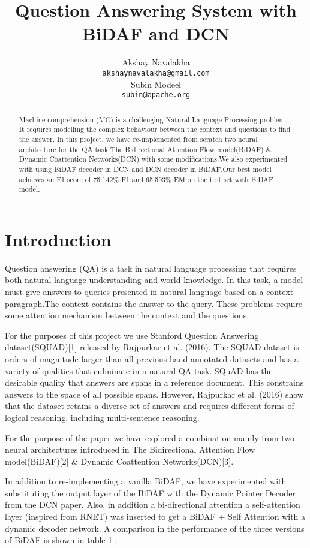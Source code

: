 \documentclass{article} %
\title{Question Answering System with BiDAF and DCN}
\author{
Akshay Navalakha \\
\texttt{akshaynavalakha@gmail.com} \\
\And
Subin Modeel \\
\texttt{subin@apache.org} \\
}
\begin{document}
\maketitle

\begin{abstract}
Machine comprehension (MC) is a challenging Natural Language Processing problem. It requires modelling the complex behaviour between the context and questions to find the answer. In this project, we have re-implemented from scratch two neural architecture for the QA task The Bidirectional Attention Flow
model(BiDAF) \& Dynamic Coattention Networks(DCN) with some modifications.We also experimented with using BiDAF decoder in DCN and DCN decoder in BiDAF.Our best model achieves an F1 score of  75.142\% F1 and 65.593\% EM on the test set with BiDAF model.
\end{abstract}

\section{Introduction}

Question answering (QA) is a task in natural language processing that requires both natural language understanding and world knowledge. In this task, a model must give answers to queries presented in natural language based on a context paragraph.The context contains the answer to the query. These problems require some attention mechanism between the context and the questions.

For the purposes of this project we use Stanford Question Answering dataset(SQUAD)[1] released by Rajpurkar et al. (2016). The SQUAD dataset is orders of magnitude larger than all previous hand-annotated datasets and has a variety of qualities that culminate in a natural QA task. SQuAD has the desirable quality that answers are spans in a reference document. This constrains answers to the space of all possible spans. However, Rajpurkar et al. (2016) show that the dataset retains a diverse set of answers and requires different forms of logical reasoning, including multi-sentence reasoning.

For the purpose of the paper we have explored a combination mainly from two neural architectures introduced in The Bidirectional Attention Flow model(BiDAF)[2] \& Dynamic Coattention Networks(DCN)[3].

In addition to re-implementing a vanilla BiDAF, we have experimented with substituting the output layer of the BiDAF with the Dynamic Pointer Decoder from the DCN paper. Also, in addition a bi-directional attention a self-attention layer (inspired from RNET) was inserted to get a BiDAF + Self Attention with a dynamic decoder network. A comparison in the performance of the three versions of BiDAF is shown in table 1 .
\end{document}
